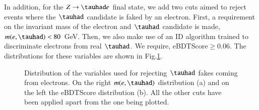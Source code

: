 In addition, for the $Z\to\tauhad e$ final state, we add two cuts aimed to reject events where the $\tauhad$ candidate is faked by an electron. First, a requirement on the invariant mass of the electron and $\tauhad$ candidate is made, $m(e,\tauhad)<80$ GeV. Then, we also make use of an ID algorithm trained to discriminate electrons from real $\tauhad$. We require, eBDTScore$\geq 0.06$. The distributions for these variables are shown in Fig.\ref{Fig5}.
\begin{figure}[htbp]
	\centering
	\hfill
	\caption{Distribution of the variables used for rejecting $\tauhad$ fakes coming from electrons. On the right $m(e,\tauhad)$ distribution (a) and on the left the eBDTScore distribution (b). All the other cuts have been applied apart from the one being plotted.}
	\label{Fig5}
\end{figure}

